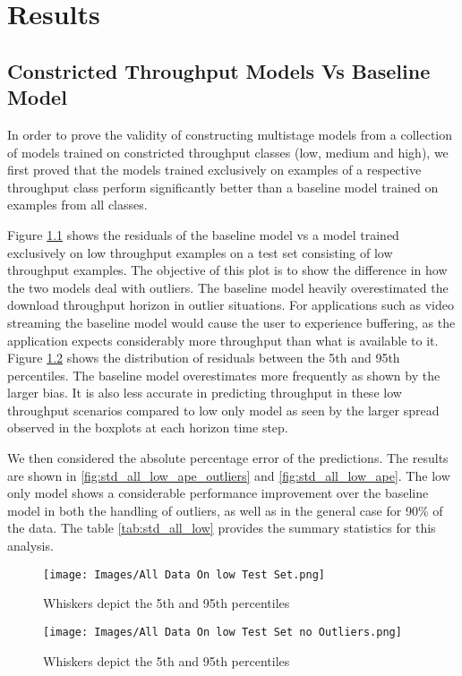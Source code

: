 \chapter{Results}
\label{chp:experiments} 
\section{Constricted Throughput Models Vs Baseline Model}
In order to prove the validity of constructing multistage models from a collection of models trained on constricted throughput classes (low, medium and high), we first proved that the models trained exclusively on examples of a respective throughput class perform significantly better than a baseline model trained on examples from all classes.

Figure \ref{fig:std_all_low_resids_outliers} shows the residuals of the baseline model vs a model trained exclusively on low throughput examples on a test set consisting of low throughput examples. The objective of this plot is to show the difference in how the two models deal with outliers. The baseline model heavily overestimated the download throughput horizon in outlier situations. For applications such as video streaming the baseline model would cause the user to experience buffering, as the application expects considerably more throughput than what is available to it. Figure \ref{fig:std_all_low_resids} shows the distribution of residuals between the 5th and 95th percentiles. The baseline model overestimates more frequently as shown by the larger bias. It is also less accurate in predicting throughput in these low throughput scenarios compared to low only model as seen by the larger spread observed in the boxplots at each horizon time step.

We then considered the absolute percentage error of the predictions. The results are shown in \ref{fig:std_all_low_ape_outliers} and \ref{fig:std_all_low_ape}. The low only model shows a considerable performance improvement over the baseline model in both the handling of outliers, as well as in the general case for 90\% of the data. The table \ref{tab:std_all_low} provides the summary statistics for this analysis.

\begin{figure}[h]
\texttt{[image: Images/All Data On low Test Set.png]}
\centering
\caption{Whiskers depict the 5th and 95th percentiles}
\label{fig:std_all_low_resids_outliers}
\end{figure}

\begin{figure}[h]
\texttt{[image: Images/All Data On low Test Set no Outliers.png]}
\centering
\caption{Whiskers depict the 5th and 95th percentiles}
\label{fig:std_all_low_resids}
\end{figure}

